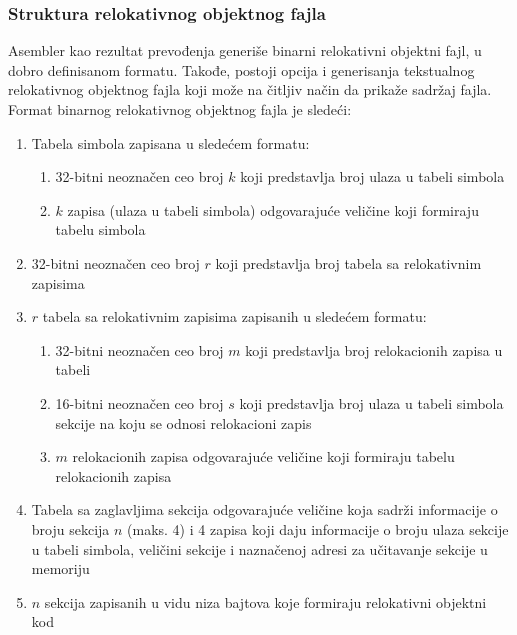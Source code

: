 \subsubsection{Struktura relokativnog objektnog fajla}
Asembler kao rezultat prevođenja generiše binarni relokativni objektni fajl, u dobro
definisanom formatu. Takođe, postoji opcija i generisanja tekstualnog relokativnog
objektnog fajla koji može na čitljiv način da prikaže sadržaj fajla. Format binarnog
relokativnog objektnog fajla je sledeći:
\begin{enumerate}
    \item Tabela simbola zapisana u sledećem formatu:
    \begin{enumerate}
        \item 32-bitni neoznačen ceo broj $k$ koji predstavlja broj ulaza u tabeli simbola
        \item $k$ zapisa (ulaza u tabeli simbola) odgovarajuće veličine koji formi\-raju tabelu simbola
    \end{enumerate}
    \item 32-bitni neoznačen ceo broj $r$ koji predstavlja broj tabela sa relokati\-vnim zapisima
    \item $r$ tabela sa relokativnim zapisima zapisanih u sledećem formatu:
    \begin{enumerate}
        \item 32-bitni neoznačen ceo broj $m$ koji predstavlja broj relokacionih zapisa u tabeli
        \item 16-bitni neoznačen ceo broj $s$ koji predstavlja broj ulaza u tabeli simbola
              sekcije na koju se odnosi relokacioni zapis
        \item $m$ relokacionih zapisa odgovarajuće veličine koji formiraju tabelu relokacionih zapisa
    \end{enumerate}
    \item Tabela sa zaglavljima sekcija odgovarajuće veličine koja sadrži informa\-cije o broju sekcija
          $n$ (maks. 4) i 4 zapisa koji daju informacije o broju ulaza sekcije u tabeli simbola,
          veličini sekcije i naznačenoj adresi za učitavanje sekcije u memoriju
   \item $n$ sekcija zapisanih u vidu niza bajtova koje formiraju relokativni obje\-ktni kod
\end{enumerate}
\newpage %

